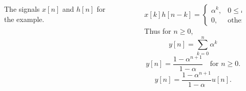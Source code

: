 \begin{frame}[plain]
    \begin{columns}
        \begin{column}{0.6\textwidth}
            {
            \begin{figure}
              \centering
              
              \caption{The signals $x[n]$ and $h[n]$ for the example.}\label{fi:dt_conv_example23}
            \end{figure}
            }
        \end{column}
        \begin{column}{0.4\textwidth}
            \begin{equation*}
                x[k]h[n-k] = \begin{cases}\alpha^k, & 0 \leq k \leq n,\\ 0, &\text{otherwise}.\end{cases}
            \end{equation*}
            \pause
            Thus for $n \geq 0$,
            \begin{equation*}
                y[n] = \sum_{k=0}^{n}\alpha^k
            \end{equation*}
            \begin{equation*}
                y[n] = \frac{1-\alpha^{n+1}}{1-\alpha}\quad \text{for } n \geq 0.
            \end{equation*}
            \begin{equation*}
                y[n] = \frac{1-\alpha^{n+1}}{1-\alpha}u[n].
            \end{equation*}
        \end{column}
    \end{columns}

\end{frame}

\begin{frame}
\end{frame}



%
%


